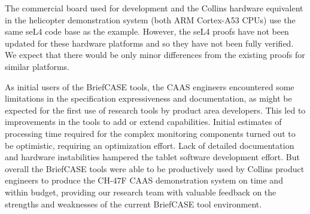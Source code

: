 The commercial board used for development and the Collins hardware equivalent
in the helicopter demonstration system (both ARM Cortex-A53 CPUs) use the same seL4 code base as the  example.  
However, the seL4 proofs have not been updated for these hardware platforms and so they have not been fully verified.
We expect that there would be only minor differences from the existing proofs for similar platforms.

As initial users of the BriefCASE tools, the CAAS engineers encountered some limitations in the
specification expressiveness and documentation, as might be
expected for the first use of research tools by product area developers. 
This led to improvements in the tools to add or extend capabilities.  Initial estimates of
processing time required for the complex monitoring components turned out to be optimistic,
requiring an optimization effort. Lack of detailed documentation and hardware instabilities 
hampered the tablet software development effort. But overall the BriefCASE tools were able
to be productively used by Collins product engineers to produce the CH-47F CAAS demonstration
system on time and within budget, providing our research team with valuable feedback on the
strengths and weaknesses of the current BriefCASE tool environment.
